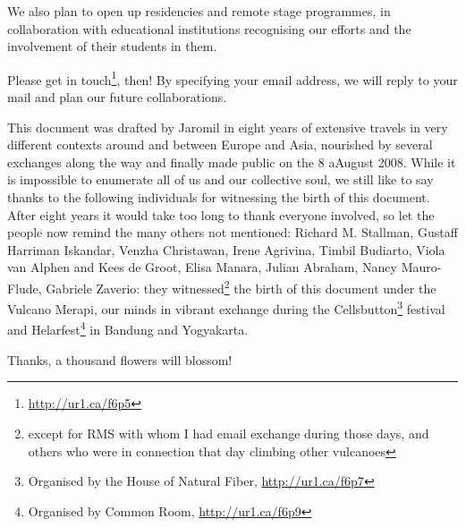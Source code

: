 We also plan to open up residencies and remote stage programmes, in
collaboration with educational institutions recognising our ef\hbox{}forts and
the involvement of their students in them.

Please get in touch\footnote{\url{http://ur1.ca/f6p5}}, then! By specifying your
email address, we will reply to your mail and plan our future collaborations.

This document was drafted by Jaromil in eight years of extensive travels in very
dif\hbox{}ferent contexts around and between Europe and Asia, nourished by
several exchanges along the way and f\hbox{}inally made public on the 8 aAugust
2008. While it is impossible to enumerate all of us and our collective soul, we
still like to say thanks to the following individuals for witnessing the birth
of this document. After eight years it would take too long to thank everyone
involved, so let the people now remind the many others not mentioned: Richard M.
Stallman, Gustaf\hbox{}f Harriman Iskandar, Venzha Christawan, Irene Agrivina,
Timbil Budiarto, Viola van Alphen and Kees de Groot, Elisa Manara, Julian
Abraham, Nancy Mauro-F\hbox{}lude, Gabriele Zaverio: they
witnessed\footnote{except for RMS with whom I had email exchange during those
days, and others who were in connection that day climbing other vulcanoes} the
birth of this document under the Vulcano Merapi, our minds in vibrant exchange
during the Cellsbutton\footnote{Organised by the House of Natural F\hbox{}iber,
\url{http://ur1.ca/f6p7}} festival and Helarfest\footnote{Organised by Common
Room, \url{http://ur1.ca/f6p9}} in Bandung and Yogyakarta.

Thanks, a thousand f\hbox{}lowers will blossom!

